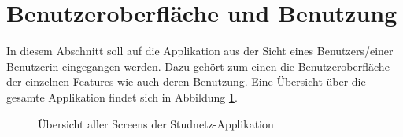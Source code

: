 \documentclass[../main.tex]{subfiles}
\begin{document}
\section{Benutzeroberfläche und Benutzung}%
In diesem Abschnitt soll auf die Applikation aus der Sicht eines Benutzers/einer Benutzerin eingegangen werden. Dazu gehört zum einen die Benutzeroberfläche der einzelnen Features wie auch deren Benutzung. Eine Übersicht über die gesamte Applikation findet sich in Abbildung \ref{overview}.
\begin{figure} 
	\centering
	\caption{Übersicht aller Screens der Studnetz-Applikation}
	\label{overview}
\end{figure}
\end{document}
